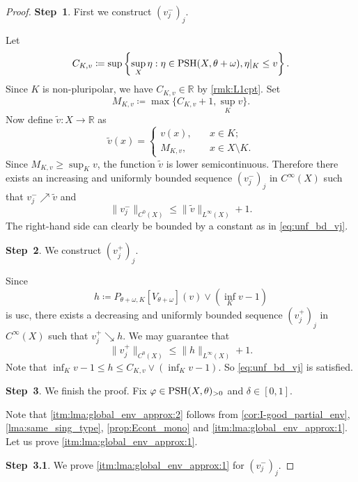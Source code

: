 \begin{proof}
    \textbf{Step~1}. First we construct $(v^-_j)_j$.

    Let
    \[
        C_{K,v} \coloneqq \sup\left\{\sup_X \eta : \eta \in \mathrm{PSH}(X,\theta+\omega),  \eta|_K \leq v\right\}.
    \]
    Since $K$ is non-pluripolar, we have $C_{K,v} \in \mathbb{R}$ by \cref{rmk:L1cpt}.
    Set
    \[
    M_{K,v}\coloneqq \max\{C_{K,v}+1,\sup_K v\}.
    \]
    Now define $\widetilde v \colon X \to \mathbb{R}$ as
    \[
    \widetilde{v}(x)=\left\{
    \begin{aligned}
        v(x),&\quad x\in K;\\
        M_{K,v},&\quad x\in X\setminus K.
    \end{aligned}
    \right.
    \]
    Since $M_{K,v}\geq \sup_K v$, the function $\widetilde v$ is lower semicontinuous. Therefore there exists an increasing and uniformly bounded sequence $(v^-_j)_j$ in $C^\infty(X)$ such that $v^-_j \nearrow \widetilde v$ and
    \[
        \|v_j^-\|_{C^0(X)}\leq \|\tilde{v}\|_{L^{\infty}(X)}+1.
    \]
    The right-hand side can clearly be bounded by a constant as in \eqref{eq:unf_bd_vj}.

    \textbf{Step~2}. We construct $(v_j^+)_j$.

    Since
\[
h \coloneqq P_{\theta + \omega,K}[V_{\theta+\omega}](v) \lor \left(\inf_K v -1\right)
\]
is usc, there exists a decreasing and uniformly bounded sequence $(v^+_j)_j$ in $C^\infty(X)$ such that $v^+_j \searrow h$. We may guarantee that
\[
\|v^+_j\|_{C^0(X)}\leq \|h\|_{L^{\infty}(X)}+1.
\]
Note that $\inf_K v-1\leq h\leq C_{K,v} \lor (\inf_K v-1)$. So \eqref{eq:unf_bd_vj} is satisfied.




\textbf{Step~3}. We finish the proof. Fix $\varphi\in \mathrm{PSH}(X,\theta)_{>0}$ and $\delta\in [0,1]$.

Note that \ref{itm:lma:global_env_approx:2} follows from \cref{cor:I-good_partial_env}, \cref{lma:same_sing_type}, \cref{prop:Econt_mono} and \ref{itm:lma:global_env_approx:1}. Let us prove \ref{itm:lma:global_env_approx:1}.

\textbf{Step~3.1}. We prove \ref{itm:lma:global_env_approx:1} for $(v^-_j)_j$.


\end{proof}

